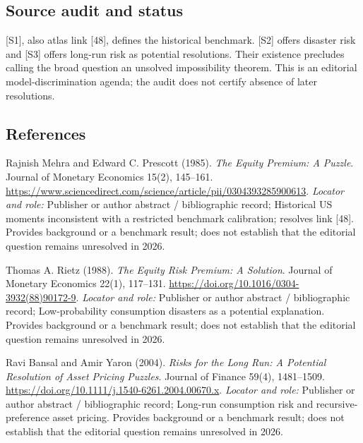 \documentclass[11pt,a4paper]{article}
\begin{document}
\subsection*{Source audit and status}
[S1], also atlas link [48], defines the historical benchmark. [S2] offers disaster risk and [S3] offers long-run risk as potential resolutions. Their existence precludes calling the broad question an unsolved impossibility theorem. This is an editorial model-discrimination agenda; the audit does not certify absence of later resolutions.

\subsection*{References}

\begin{enumerate}[label={[S\arabic*]},leftmargin=*]

\item Rajnish Mehra and Edward C. Prescott (1985). \emph{The Equity Premium: A Puzzle}. Journal of Monetary Economics 15(2), 145–161. \url{https://www.sciencedirect.com/science/article/pii/0304393285900613}.
\textit{Locator and role:} Publisher or author abstract / bibliographic record; Historical US moments inconsistent with a restricted benchmark calibration; resolves link [48]. Provides background or a benchmark result; does not establish that the editorial question remains unresolved in 2026.

\item Thomas A. Rietz (1988). \emph{The Equity Risk Premium: A Solution}. Journal of Monetary Economics 22(1), 117–131. \url{https://doi.org/10.1016/0304-3932(88)90172-9}.
\textit{Locator and role:} Publisher or author abstract / bibliographic record; Low-probability consumption disasters as a potential explanation. Provides background or a benchmark result; does not establish that the editorial question remains unresolved in 2026.

\item Ravi Bansal and Amir Yaron (2004). \emph{Risks for the Long Run: A Potential Resolution of Asset Pricing Puzzles}. Journal of Finance 59(4), 1481–1509. \url{https://doi.org/10.1111/j.1540-6261.2004.00670.x}.
\textit{Locator and role:} Publisher or author abstract / bibliographic record; Long-run consumption risk and recursive-preference asset pricing. Provides background or a benchmark result; does not establish that the editorial question remains unresolved in 2026.

\end{enumerate}
\end{document}
